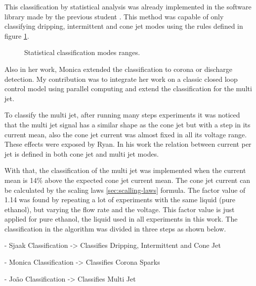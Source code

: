  

This classification by statistical analysis was already implemented in the software library made by the previous student \cite{Monica}.
This method was capable of only classifying dripping, intermittent and cone jet modes using the rules defined in figure \ref{fig:statis_ranges}. 
\begin{figure}[H]
    \centering
    \caption{Statistical classification modes ranges.}
    \label{fig:statis_ranges}
\end{figure}

Also in her work, Monica extended the classification to corona or discharge detection.
My contribution was to integrate her work on a classic closed loop control model using parallel computing and extend the classification for the multi jet.

To classify the multi jet, after running many steps experiments it was noticed that the multi jet signal has a similar shape as the cone jet but with a step in its current mean, also the cone jet current was almost fixed in all its voltage range. 
These effects were exposed by Ryan\cite{Ryan}. In his work the relation between current per jet is defined in both cone jet and multi jet modes.

With that, the classification of the multi jet was implemented  when the current mean is 14\% above the expected cone jet current mean. 
The cone jet current can be calculated by the scaling laws \ref{sec:scalling-laws} formula.
The factor value of 1.14 was found by repeating a lot of experiments with the same liquid (pure ethanol), but varying the flow rate and the voltage. This factor value is just applied for pure ethanol, the liquid used in all experiments in this work.
The classification in the algorithm was divided in three steps as shown below.

        - Sjaak Classification -> Classifies Dripping, Intermittent and Cone Jet
        
        - Monica Classification -> Classifies Corona Sparks

        - João Classification -> Classifies Multi Jet

